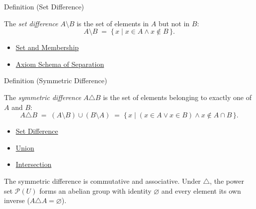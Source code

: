 \begin{definitionbox}{Definition (Set Difference)}
\begin{definition}\label{def:set-difference}
The \emph{set difference} $A \setminus B$ is the set of elements in $A$ but
not in $B$:
\[
A \setminus B \;=\; \{\, x \mid x \in A \land x \notin B \,\}.
\]
\end{definition}
\end{definitionbox}

\begin{dependencies}
\begin{itemize}
  \item \hyperref[def:set-membership]{Set and Membership}
  \item \hyperref[ax:separation]{Axiom Schema of Separation}
\end{itemize}
\end{dependencies}



\begin{definitionbox}{Definition (Symmetric Difference)}
\begin{definition}\label{def:sym-diff}
The \emph{symmetric difference} $A \triangle B$ is the set of elements
belonging to exactly one of $A$ and $B$:
\[
A \triangle B
\;=\;
(A \setminus B) \cup (B \setminus A)
\;=\;
\{\, x \mid (x \in A \lor x \in B) \land x \notin A \cap B \,\}.
\]
\end{definition}
\end{definitionbox}

\begin{dependencies}
\begin{itemize}
  \item \hyperref[def:set-difference]{Set Difference}
  \item \hyperref[def:union]{Union}
  \item \hyperref[def:intersection]{Intersection}
\end{itemize}
\end{dependencies}



\begin{remark*}
The symmetric difference is commutative and associative. Under $\triangle$,
the power set $\mathcal{P}(U)$ forms an abelian group with identity
$\varnothing$ and every element its own inverse ($A \triangle A = \varnothing$).
\end{remark*}

